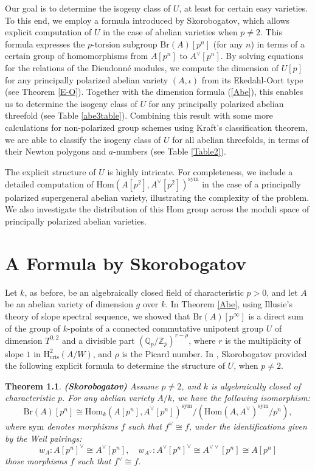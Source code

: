 \documentclass[a4paper,12pt,twoside]{report}
\newtheorem{theorem}{Theorem}[section]
\newcommand{\Q}{\mathbb{Q}}
\newcommand{\Z}{\mathbb{Z}}
\newcommand{\cris}{\mathrm{cris}}
\newcommand{\Br}{\mathrm{Br}}
\newcommand{\HH}{\mathrm{H}}
\newcommand{\Hom}{\mathrm{Hom}}
\newcommand{\sym}{\mathrm{sym}}
\begin{document}
Our goal is to determine the isogeny class of $U$, at least for certain easy varieties. 
To this end, we employ a formula introduced by Skorobogatov, 
which allows explicit computation of $U$ in the case of abelian varieties when $p \neq 2$. 
This formula expresses the $p$-torsion subgroup $\Br(A)[p^n]$ (for any $n$) in terms of a certain group of homomorphisms 
from $A[p^n]$ to $A^\vee[p^n]$. By solving equations for the relations of the Dieudonné modules, 
we compute the dimension of $U[p]$ for any principally polarized abelian variety $(A, \iota)$ 
from its Ekedahl-Oort type (see Theorem \ref{E-O}). 
Together with the dimension formula (\ref{Abe}), this enables us to determine the isogeny class of $U$ 
for any principally polarized abelian threefold (see Table \ref{abe3table}). 
Combining this result with some more calculations for non-polarized group schemes using Kraft's classification theorem, 
we are able to classify the isogeny class of $U$ for all abelian threefolds, 
in terms of their Newton polygons and $a$-numbers (see Table \ref{Table2}).

The explicit structure of $U$ is highly intricate. 
For completeness, we include a detailed computation of $\Hom(A[p^2], A^{\vee}[p^2])^{\mathrm{sym}}$ 
in the case of a principally polarized supergeneral abelian variety, 
illustrating the complexity of the problem. 
We also investigate the distribution of this Hom group across the moduli 
space of principally polarized abelian varieties.

\chapter{A Formula by Skorobogatov} \label{Ch3}

Let $k$, as before, be an algebraically closed field of characteristic $p>0$, 
and let $A$ be an abelian variety of dimension $g$ over $k$. 
In Theorem \ref{Abe}, using Illusie's theory of slope spectral sequence, 
we showed that $\Br(A)[p^\infty]$ is a direct sum of the group of $k$-points 
of a connected commutative unipotent group $U$ of dimension $T^{0,2}$ 
and a divisible part $(\Q_p/\Z_p)^{r-\rho}$, where $r$ is the multiplicity of slope $1$ in $\HH_{\cris}^2(A/W)$, 
and $\rho$ is the Picard number. 
In \cite{Skor}, Skorobogatov provided the following explicit formula to 
determine the structure of $U$, when $p\neq 2$. 

\begin{theorem}\label{Skorobogatov}{\bf (Skorobogatov)}
    Assume $p\neq 2$, and $k$ is algebraically closed of characteristic $p$. For any abelian variety $A/k$, 
    we have the following isomorphism: 
    \[\Br(A)[p^n]\cong \Hom_k(A[p^n],A^{\vee}[p^n])^{\sym}/(\Hom(A,A^{\vee})^{\sym}/p^n),\]
    where \emph{$\sym$} denotes morphisms $f$ such that $f^\vee\cong f$, 
    under the identifications given by the Weil pairings: 
    \[w_A:A[p^n]^{\vee}\cong A^{\vee}[p^n],\quad w_{A^\vee}: A^{\vee}[p^n]^{\vee}\cong A^{\vee\vee}[p^n]\cong A[p^n]\]
    those morphisms $f$ such that $f^{\vee}\cong f$. 
\end{theorem}
\end{document}
